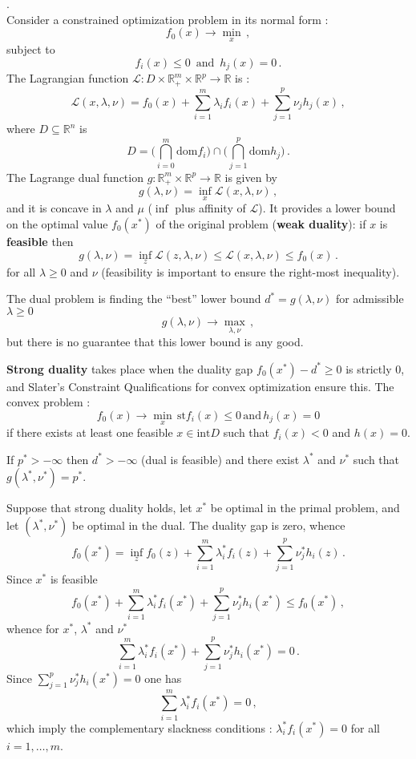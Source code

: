 \documentclass[a4paper]{article}
\newcommand{\Real}{\mathbb{R}}
\newcommand{\Lcal}{\mathcal{L}}
\begin{document}
 .\hfill\\
Consider a constrained optimization problem in its normal form :
\[ f_0(x) \to \min_x \,, \]
subject to
\[ f_i(x) \leq 0\,\text{ and }\, h_j(x) = 0 \,. \]
The Lagrangian function $\Lcal: D \times \Real_+^m \times \Real^p \to \Real$ is :
\[
\Lcal(x, \lambda, \nu) = f_0(x) + \sum_{i=1}^m \lambda_i f_i(x) + \sum_{j=1}^p \nu_j h_j(x) \,,
\]
where $D \subseteq \Real^n$ is
\[
D = \bigl( \bigcap_{i=0}^m \text{dom} f_i \bigr) \cap \bigl( \bigcap_{j=1}^p \text{dom} h_j \bigr) \,.
\]
The Lagrange dual function $g : \Real_+^m \times \Real^p \to \Real$ is given by
\[
g(\lambda,\nu) = \inf_x \Lcal(x,\lambda,\nu)\,,
\]
and it is concave in $\lambda$ and $\mu$ ($\inf$ plus affinity of $\Lcal$). It provides
a lower bound on the optimal value $f_0(x^*)$ of the original problem (\textbf{weak duality}):
if $x$ is \textbf{feasible} then
\[ 
g(\lambda,\nu) = \inf_z \Lcal(z,\lambda,\nu)\leq \Lcal(x, \lambda,\nu) \leq f_0(x) \,.
\]
for all $\lambda\geq0$ and $\nu$ (feasibility is important to ensure the right-most
inequality).

The dual problem is finding the ``best'' lower bound $d^* = g(\lambda,\nu)$ for
admissible $\lambda\geq 0$
\[
g(\lambda,\nu) \to \max_{\lambda,\nu}\,,
\]
but there is no guarantee that this lower bound is any good.

\textbf{Strong duality} takes place when the duality gap $f_0(x^*) - d^*\geq 0$ is
strictly $0$, and Slater's Constraint Qualifications for convex optimization ensure
this. The convex problem :
\[ f_0(x) \to \min_x\,\text{st} f_i(x) \leq 0\,\text{and}\, h_j(x) = 0\]
if there exists at least one feasible $x\in \text{int} D$ such that $f_i(x) < 0$ and $h(x) = 0$.

If $p^*>-\infty$ then $d^*>-\infty$ (dual is feasible) and there exist $\lambda^*$
and $\nu^*$ such that $g(\lambda^*, \nu^*) = p^*$.

Suppose that strong duality holds, let $x^*$ be optimal in the primal problem, and
let $(\lambda^*, \nu^*)$ be optimal in the dual. The duality gap is zero, whence
\[
f_0(x^*)
= \inf_z f_0(z) + \sum_{i=1}^m\lambda_i^* f_i(z) + \sum_{j=1}^p\nu_j^* h_i(z)\,.
\]
Since $x^*$ is feasible
\[
f_0(x^*) + \sum_{i=1}^m\lambda_i^* f_i(x^*) + \sum_{j=1}^p\nu_j^* h_i(x^*)
\leq f_0(x^*)\,,
\]
whence for $x^*$, $\lambda^*$ and $\nu^*$
\[
\sum_{i=1}^m \lambda_i^* f_i(x^*) + \sum_{j=1}^p\nu_j^* h_i(x^*) = 0 \,.
\]
Since $ \sum_{j=1}^p\nu_j^* h_i(x^*) = 0$ one has
\[ \sum_{i=1}^m \lambda_i^* f_i(x^*) = 0 \,,\]
which imply the complementary slackness conditions : $\lambda_i^* f_i(x^*) = 0$
for all $i=1,\ldots,m$.
\end{document}
